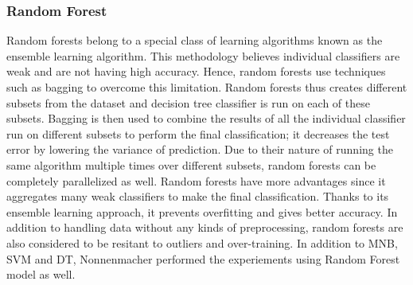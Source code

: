 \documentclass[a4paper,12pt,twoside]{report}
\begin{document}
\subsubsection{Random Forest}
Random forests belong to a special class of learning algorithms known as the ensemble learning algorithm. This methodology believes individual classifiers are weak and are not having high accuracy. Hence, random forests use techniques such as bagging to overcome this limitation. Random forests thus creates different subsets from the dataset and decision tree classifier is run on each of these subsets. Bagging is then used to combine the results of all the individual classifier run on different subsets to perform the final classification; it decreases the test error by lowering the variance of prediction\cite{Jain2017}. 
\newline \newline
Due to their nature of running the same algorithm multiple times over different subsets, random forests can be completely parallelized as well. Random forests have more advantages since it aggregates many weak classifiers to make the final classification. Thanks to its ensemble learning approach, it prevents overfitting and gives better accuracy. In addition to handling data without any kinds of preprocessing, random forests are also considered to be resitant to outliers and over-training\cite{Jain2017}. In addition to MNB, SVM and DT, Nonnenmacher\cite{Nonnenmacher2017} performed the experiements using Random Forest model as well. 
\end{document}
